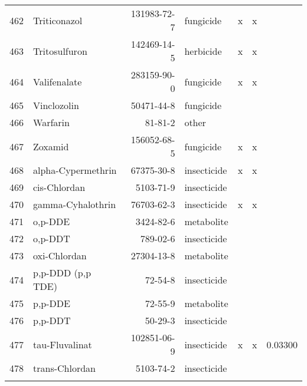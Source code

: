 \begin{longtable}{lp{4cm}rlp{1.3cm}p{1.3cm}p{1.5cm}}
  462 & Triticonazol & 131983-72-7 & fungicide & x & x &  \\ 
  463 & Tritosulfuron & 142469-14-5 & herbicide & x & x &  \\ 
  464 & Valifenalate & 283159-90-0 & fungicide & x & x &  \\ 
  465 & Vinclozolin & 50471-44-8 & fungicide &  &  &  \\ 
  466 & Warfarin & 81-81-2 & other &  &  &  \\ 
  467 & Zoxamid & 156052-68-5 & fungicide & x & x &  \\ 
  468 & alpha-Cypermethrin & 67375-30-8 & insecticide & x & x &  \\ 
  469 & cis-Chlordan & 5103-71-9 & insecticide &  &  &  \\ 
  470 & gamma-Cyhalothrin & 76703-62-3 & insecticide & x & x &  \\ 
  471 & o,p-DDE & 3424-82-6 & metabolite &  &  &  \\ 
  472 & o,p-DDT & 789-02-6 & insecticide &  &  &  \\ 
  473 & oxi-Chlordan & 27304-13-8 & metabolite &  &  &  \\ 
  474 & p,p-DDD (p,p TDE) & 72-54-8 & insecticide &  &  &  \\ 
  475 & p,p-DDE & 72-55-9 & metabolite &  &  &  \\ 
  476 & p,p-DDT & 50-29-3 & insecticide &  &  &  \\ 
  477 & tau-Fluvalinat & 102851-06-9 & insecticide & x & x & 0.03300 \\ 
  478 & trans-Chlordan & 5103-74-2 & insecticide &  &  &  \\ 
  \label{tab:phch_var}
\end{longtable}
